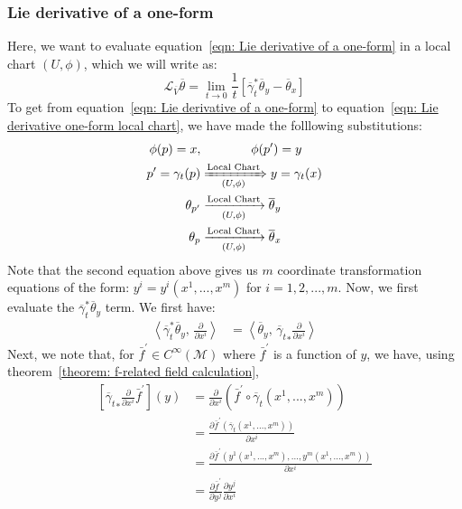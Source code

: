       \subsubsection{Lie derivative of a one-form}
        Here, we want to evaluate equation~\ref{eqn: Lie derivative of a
        one-form} in a local chart $(U,\phi)$, which we will write as:
        \begin{equation}
          \label{eqn: Lie derivative one-form local chart}
          \mathcal{L}_{\overline{V}} \overline{\theta} = \lim_{t\to
          0}\frac{1}{t}\left[\overline{\gamma}_t^* \overline{\theta}_y -
          \overline{\theta}_x\right]
        \end{equation}
        To get from equation~\ref{eqn: Lie derivative of a one-form} to
        equation~\ref{eqn: Lie derivative one-form local chart}, we have made
        the folllowing substitutions:
        \begin{align*}
          \phi(p) = x, &\quad \quad \quad \quad \phi(p^\prime) = y \\
          p^\prime = \gamma_t(p) &\xRightarrow[(U,\phi)]{\text{Local Chart}}
          y = \gamma_t(x)\\
          \theta_{p^\prime} &\xrightarrow[(U,\phi)]{\text{Local Chart}}
          \overline{\theta}_y \\
          \theta_{p} &\xrightarrow[(U,\phi)]{\text{Local Chart}}
          \overline{\theta}_x
        \end{align*}
        Note that the second equation above gives us $m$ coordinate
        transformation equations of the form: $y^i = y^i(x^1,...,x^m)$ for $i
        = 1,2,...,m$. Now, we first evaluate the $\overline{\gamma}_t^*
        \overline{\theta}_y$ term. We first have:
        \begin{align*}
          \left\langle \overline{\gamma}_t^* \overline{\theta}_y, \,
          \frac{\partial}{\partial x^i} \right\rangle
          &= \left\langle  \overline{\theta}_y, \,
          {\overline{\gamma}_t}_*\frac{\partial}{\partial x^i} \right\rangle
        \end{align*}
        Next, we note that, for $\bar{f}^\prime \in C^\infty(\mathcal{M})$
        where $\bar{f}^\prime$ is a function of $y$, we have, using
        theorem~\ref{theorem: f-related field calculation},
        \begin{align*}
          \left[{\overline{\gamma}_t}_*\frac{\partial}{\partial x^i}
          \bar{f}^\prime\right](y) 
          &= \frac{\partial}{\partial x^i}\left(\bar{f}^\prime \circ
          \overline{\gamma}_t(x^1,...,x^m) \right) \\
          &= \frac{\partial \bar{f}^\prime\left(
          \overline{\gamma}_t(x^1,...,x^m) \right)}{\partial x^i} \\
          &= \frac{\partial \bar{f}^\prime\left(
          y^1(x^1,...,x^m),...,y^m(x^1,...,x^m) \right)}{\partial x^i}\\
          &= \frac{\partial \bar{f}^\prime}{\partial y^j}\frac{\partial
          y^j}{\partial x^i}
        \end{align*}
